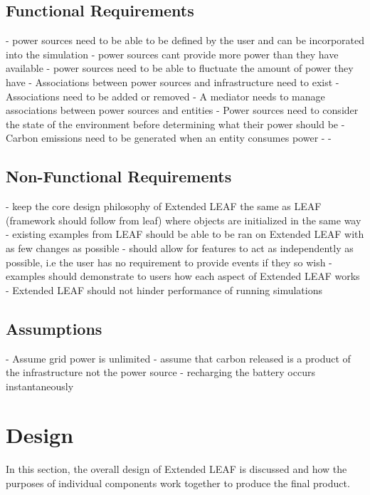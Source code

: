\documentclass{l4proj}
\begin{document}
\section{Functional Requirements}
- power sources need to be able to be defined by the user and can be incorporated into the simulation
- power sources cant provide more power than they have available
- power sources need to be able to fluctuate the amount of power they have
- Associations between power sources and infrastructure need to exist
- Associations need to be added or removed
- A mediator needs to manage associations between power sources and entities
- Power sources need to consider the state of the environment before determining what their power should be
- Carbon emissions need to be generated when an entity consumes power
-
-
\section{Non-Functional Requirements}
- keep the core design philosophy of Extended LEAF the same as LEAF (framework should follow from leaf) where objects are initialized in the same way
- existing examples from LEAF should be able to be ran on Extended LEAF with as few changes as possible
- should allow for features to act as independently as possible, i.e the user has no requirement to provide events if they so wish
- examples should demonstrate to users how each aspect of Extended LEAF works
- Extended LEAF should not hinder performance of running simulations

\section{Assumptions}
- Assume grid power is unlimited
- assume that carbon released is a product of the infrastructure not the power source
- recharging the battery occurs instantaneously

\chapter{Design}\label{ch:design}

In this section, the overall design of Extended LEAF is discussed and how the purposes of individual components work together to produce the final product.
\end{document}
